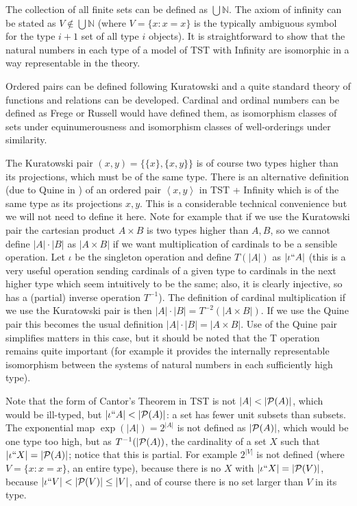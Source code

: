 \documentclass[112pt]{article}
\begin{document}
The collection of all finite sets can be defined as $\bigcup \mathbb N$.  The axiom of infinity can be stated as $V \not\in \bigcup \mathbb N$ (where $V= \{x:x=x\}$ is the typically ambiguous symbol for the type $i+1$ set of all type $i$ objects).  It is straightforward to show that the natural numbers in each type of a model of TST with Infinity are isomorphic in a way representable in the theory.

Ordered pairs can be defined following Kuratowski and a quite standard theory of functions and relations can be developed.  Cardinal and ordinal numbers can be defined as Frege or Russell would have defined them, as isomorphism classes of sets under equinumerousness and isomorphism classes of well-orderings under similarity.  

The Kuratowski pair $(x,y) = \{\{x\},\{x,y\}\}$ is of course two types higher than its projections, which must be of the same type.  There is an alternative definition (due to Quine in \cite{quinepair}) of an ordered pair
$\left< x,y\right>$ in TST + Infinity which is of the same type as its projections $x,y$.  This is a considerable technical convenience but we will not need to define it here.  Note for example that if we use the Kuratowski pair the cartesian product $A \times B$ is two types higher than $A,B$, so we cannot define $|A| \cdot |B|$ as $|A \times B|$ if we want multiplication of cardinals to be a sensible operation.  Let $\iota$ be the singleton operation and define $T(|A|)$ as $|\iota``A|$ (this is a very useful operation sending cardinals of a given type to cardinals in the next higher type which seem intuitively to be the same; also, it is clearly injective, so has a (partial) inverse operation $T^{-1}$).  The definition of cardinal multiplication if we use the Kuratowski pair is then $|A| \cdot |B| =T^{-2}(|A\times B|)$.  If we use the Quine pair this becomes the usual definition $|A| \cdot |B| =|A\times B|$.  Use of the Quine pair simplifies matters in this case, but it should be noted that the T operation remains quite important (for example it provides the internally representable isomorphism between the systems of natural numbers in each sufficiently high type).

Note that the form of Cantor's Theorem in TST is not $|A| < |{\cal P}(A)|$, which would be ill-typed, but $|\iota``A|<|{\cal P}(A)|$:  a set has fewer unit subsets than subsets.  The exponential map $\exp(|A|) = 2^{|A|}$ is not defined as $|{\cal P}(A)|$, which would be one type too high, but as $T^{-1}(|{\cal P}(A))$, the cardinality of a set $X$ such that $|\iota``X| = |{\cal P}(A)|$;   notice that this is partial.  For example
$2^{|V|}$ is not defined (where $V=\{x:x=x\}$, an entire type), because there is no $X$ with $|\iota``X|=|{\cal P}(V)|$, because $|\iota``V|<|{\cal P}(V)| \leq |V|$, and of course there is no set larger than $V$ in its type.
\end{document}
